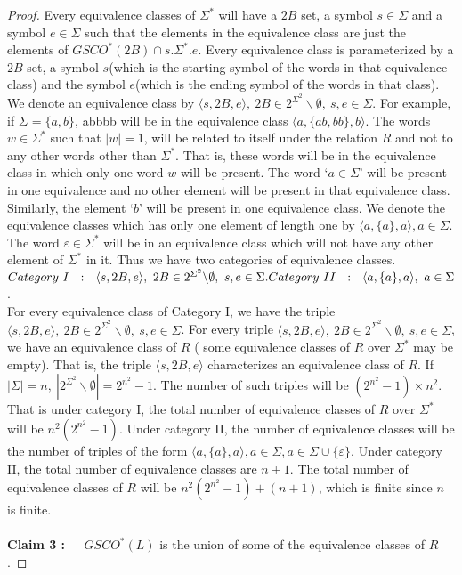 \documentclass{llncs}
\newcommand{\sg}{\Sigma}
\newcommand{\ve}{\varepsilon}
\begin{document}
\begin{proof}
\par Every equivalence classes of $\Sigma^*$ will have a $2B$ set, a
symbol $s\in \Sigma$ and a symbol $e\in \Sigma$ such that the
elements in the equivalence class are just the elements of
$GSCO^*(2B) \cap s.\Sigma^*.e$.  Every equivalence class is
parameterized by a $2B$ set, a symbol $s$(which is  the starting
symbol of the words in that equivalence class) and the symbol
$e$(which is the ending symbol of the words in that class).  We
denote an equivalence class by $\langle s,2B,e\rangle,  ~ 2B \in
  2^{\Sigma ^2} \backslash  \emptyset , ~ s,e  \in   \Sigma.$  For example,
if $\Sigma = \{a,b\}$, abbbb will be in the equivalence class
$\langle a,\{ab,bb\},b \rangle$. The words $w \in \Sigma^*$ such
that $|w| = 1$, will be related to itself under the relation $R$ and
not to any other words other than $\Sigma^* $. That is, these words
will be in the equivalence class in which only one word  $w$ will be
present. The word `$a \in \sg$' will be present in one equivalence
and no other element will be present in that equivalence class.
Similarly, the element `$b$' will be present in one equivalence
class.  We denote the equivalence classes which has only one element
of length one by $\langle a, \{a\},a \rangle,   a \in \Sigma$.  The
word $\ve \in \Sigma^*$ will be in an equivalence class which will
not have any other element of $\Sigma^*$ in it. Thus we have two
categories
of equivalence classes.\\
 $ Category ~  I  ~~ : ~~  \langle s,2B,e \rangle,  ~ 2B \in
  2^{\Sigma ^2}
\backslash  \emptyset ,~  s,e  \in   \Sigma.\\
Category  ~ II ~ ~:  ~~ \langle a, \{a\},a \rangle,  ~ a \in
\Sigma$.
\\
For every equivalence class of Category I, we have the triple
$\langle s,2B,e \rangle ,~ 2B \in   2^{\Sigma ^2}\backslash
\emptyset , ~s,e  \in \Sigma$. For every triple $\langle  s,2B,e
\rangle ,~ 2B \in 2^{\Sigma ^2}\backslash \emptyset , ~ s,e  \in
\Sigma$, we have an equivalence class of $R$ ( some equivalence
classes of $R$ over $\Sigma^*$ may be empty).  That is, the triple
$\langle s,2B,e\rangle $ characterizes an equivalence class of $R$.
If $|\Sigma| = n,~ | 2^{\Sigma ^2}\backslash  \emptyset  |  =
2^{n^2}-1$. The number of such triples will be $(2^{n^2}-1) \times
n^2$.  That is under category I, the total number of equivalence
classes of $R$ over $\Sigma^*$ will be $n^2(2^{n^2}-1)$.  Under
category II, the number of equivalence classes will be the number of
triples of the form $\langle a, \{a\},a \rangle , a \in \Sigma,   a
\in
 \Sigma \cup \{\varepsilon \}$.  Under category II, the total number
of equivalence classes are $n+1$. The total number of equivalence
classes of $R$ will be $
n^2(2^{n^2}-1) + (n+1)$, which is finite since $n$ is finite.\\\\
{\bf Claim 3 : ~~}$ GSCO^*(L)$ is the union of some of the
equivalence classes of $R$.


\end{proof}
\end{document}

